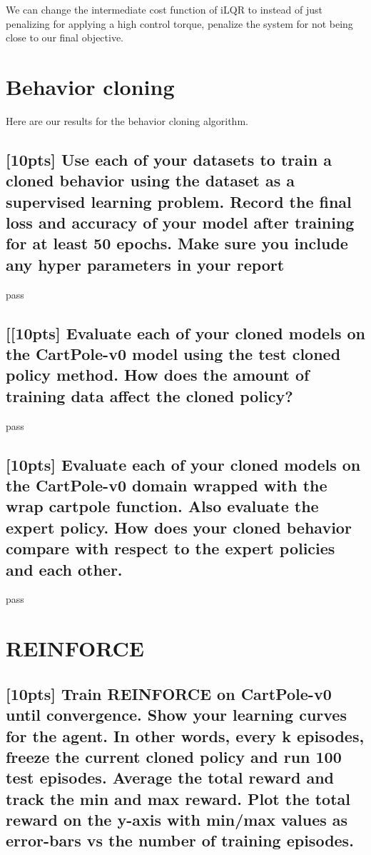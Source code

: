 \documentclass{article}
\begin{document}
We can change the intermediate cost function of iLQR to instead of just penalizing for applying a high control torque, penalize the system for not being close to our final objective. 




\section{Behavior cloning}
Here are our results for the behavior cloning algorithm. 

\subsection{[10pts] Use each of your datasets to train a cloned behavior using the dataset as a supervised learning problem. Record the final loss and accuracy of your model after training for at least 50 epochs. Make sure you include any hyper parameters in your report}

pass

\subsection{[[10pts] Evaluate each of your cloned models on the CartPole-v0 model using the test cloned policy method. How does the amount of training data affect the cloned policy?}

pass

\subsection{[10pts] Evaluate each of your cloned models on the CartPole-v0 domain wrapped with the wrap cartpole function. Also evaluate the expert policy. How does your cloned behavior compare with respect to the expert policies and each other.}

pass



\section{REINFORCE}

\subsection{[10pts] Train REINFORCE on CartPole-v0 until convergence. Show your learning curves for the agent. In other words, every k episodes, freeze the current cloned policy and run 100 test episodes. Average the total reward and track the min and max reward. Plot the total reward on the y-axis with min/max values as error-bars vs the number of training episodes.}
\end{document}
